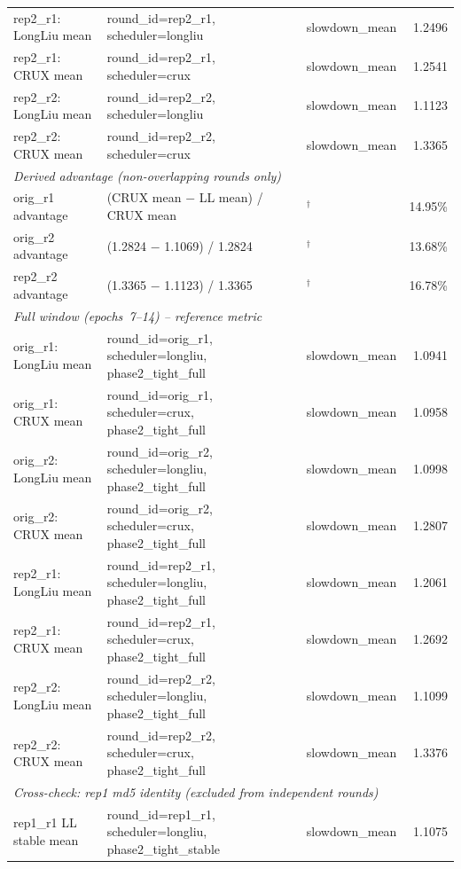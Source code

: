\begin{table}[htbp]
\begin{tabular}{lllr}
rep2\_r1: LongLiu mean & round\_id=rep2\_r1, scheduler=longliu & slowdown\_mean & 1.2496\\
rep2\_r1: CRUX mean & round\_id=rep2\_r1, scheduler=crux & slowdown\_mean & 1.2541\\
rep2\_r2: LongLiu mean & round\_id=rep2\_r2, scheduler=longliu & slowdown\_mean & 1.1123\\
rep2\_r2: CRUX mean & round\_id=rep2\_r2, scheduler=crux & slowdown\_mean & 1.3365\\
\midrule
\multicolumn{4}{l}{\textit{Derived advantage (non-overlapping rounds only)}} \\
orig\_r1 advantage & (CRUX mean $-$ LL mean) / CRUX mean & ${}^{\dagger}$ & 14.95\%\\
orig\_r2 advantage & (1.2824 $-$ 1.1069) / 1.2824 & ${}^{\dagger}$ & 13.68\%\\
rep2\_r2 advantage & (1.3365 $-$ 1.1123) / 1.3365 & ${}^{\dagger}$ & 16.78\%\\
\midrule
\multicolumn{4}{l}{\textit{Full window (epochs~7--14) -- reference metric}} \\
orig\_r1: LongLiu mean & round\_id=orig\_r1, scheduler=longliu, phase2\_tight\_full & slowdown\_mean & 1.0941\\
orig\_r1: CRUX mean & round\_id=orig\_r1, scheduler=crux, phase2\_tight\_full & slowdown\_mean & 1.0958\\
orig\_r2: LongLiu mean & round\_id=orig\_r2, scheduler=longliu, phase2\_tight\_full & slowdown\_mean & 1.0998\\
orig\_r2: CRUX mean & round\_id=orig\_r2, scheduler=crux, phase2\_tight\_full & slowdown\_mean & 1.2807\\
rep2\_r1: LongLiu mean & round\_id=rep2\_r1, scheduler=longliu, phase2\_tight\_full & slowdown\_mean & 1.2061\\
rep2\_r1: CRUX mean & round\_id=rep2\_r1, scheduler=crux, phase2\_tight\_full & slowdown\_mean & 1.2692\\
rep2\_r2: LongLiu mean & round\_id=rep2\_r2, scheduler=longliu, phase2\_tight\_full & slowdown\_mean & 1.1099\\
rep2\_r2: CRUX mean & round\_id=rep2\_r2, scheduler=crux, phase2\_tight\_full & slowdown\_mean & 1.3376\\
\midrule
\multicolumn{4}{l}{\textit{Cross-check: rep1 md5 identity (excluded from independent rounds)}} \\
rep1\_r1 LL stable mean & round\_id=rep1\_r1, scheduler=longliu, phase2\_tight\_stable & slowdown\_mean & 1.1075\\

\end{tabular}
\end{table}
